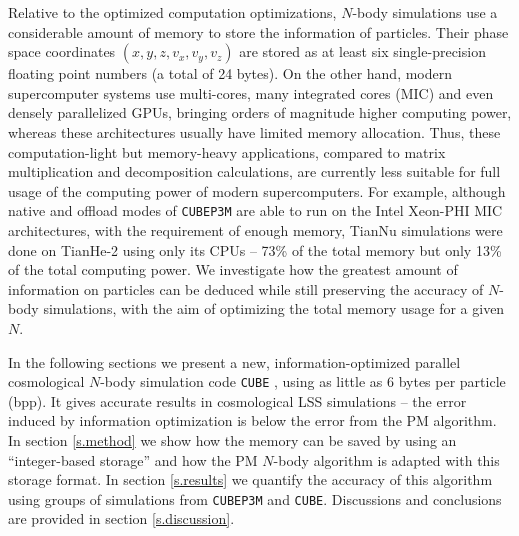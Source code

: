 \documentclass[10pt,twocolumn,preprint]{emulateapj}
\begin{document}
Relative to the optimized computation optimizations, $N$-body simulations use a considerable amount of memory to store the information of particles. Their phase space coordinates $(x,y,z,v_x,v_y,v_z)$ are stored as at least six single-precision floating point numbers (a total of 24 bytes). On the other hand, modern supercomputer systems use multi-cores, many integrated cores (MIC) and even densely parallelized GPUs, bringing orders of magnitude higher computing power, whereas these architectures usually have limited memory allocation. Thus, these computation-light but memory-heavy applications, compared to matrix multiplication and decomposition calculations, are currently less suitable for full usage of the computing power of modern supercomputers. For example, although native and offload modes of {\tt CUBEP3M} are able to run on the Intel Xeon-PHI MIC architectures, with the requirement of enough memory, TianNu simulations were done on TianHe-2 using only its CPUs -- 73\% of the total memory but only 13\% of the total computing power. We investigate how the greatest amount of information on particles can be deduced while still preserving the accuracy of $N$-body simulations, with the aim of optimizing the total memory usage for a given $N$.

In the following sections we present a new, information-optimized parallel cosmological $N$-body simulation code {\tt CUBE} \citep{2018ascl.soft05018Y}, using as little as 6 bytes per particle (bpp). It gives accurate results in cosmological LSS simulations -- the error induced by information optimization is below the error from the PM algorithm. In section \ref{s.method} we show how the memory can be saved by using an ``integer-based storage'' and how the PM $N$-body algorithm is adapted with this storage format. In section \ref{s.results} we quantify the accuracy of this algorithm using groups of simulations from {\tt CUBEP3M} and {\tt CUBE}. Discussions and conclusions are provided in section \ref{s.discussion}.
\end{document}
